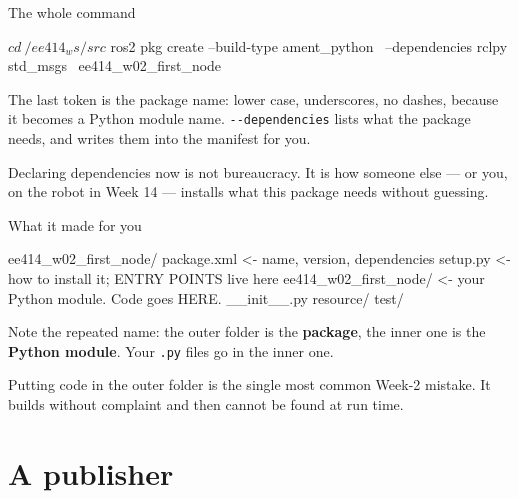 \documentclass[aspectratio=169]{beamer}
\begin{document}
\begin{frame}[fragile]{The whole command}
  \begin{shells}
$ cd ~/ee414_ws/src
$ ros2 pkg create --build-type ament_python \
      --dependencies rclpy std_msgs \
      ee414_w02_first_node
  \end{shells}

  \vspace{0.5em}
  \small
  The last token is the package name: lower case, underscores, no dashes, because it becomes
  a Python module name. \texttt{-{}-dependencies} lists what the package needs, and writes
  them into the manifest for you.

  \vspace{0.5em}
  \begin{inthefield}
    \footnotesize
    Declaring dependencies now is not bureaucracy. It is how someone else --- or you, on the
    robot in Week 14 --- installs what this package needs without guessing.
  \end{inthefield}
\end{frame}

\begin{frame}[fragile]{What it made for you}
  \begin{shells}
ee414_w02_first_node/
  package.xml                     <- name, version, dependencies
  setup.py                        <- how to install it; ENTRY POINTS live here
  ee414_w02_first_node/           <- your Python module. Code goes HERE.
      __init__.py
  resource/  test/
  \end{shells}

  \vspace{0.5em}
  \small
  Note the repeated name: the outer folder is the \textbf{package}, the inner one is the
  \textbf{Python module}. Your \texttt{.py} files go in the inner one.

  \vspace{0.4em}
  \begin{underhood}
    \footnotesize
    Putting code in the outer folder is the single most common Week-2 mistake. It builds
    without complaint and then cannot be found at run time.
  \end{underhood}
\end{frame}

\section{A publisher}
\end{document}
